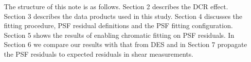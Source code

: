The structure of this note is as follows. Section 2 describes the DCR effect. 
Section 3 describes the data products used in this study. 
Section 4 discusses the fitting procedure, PSF residual definitions and the PSF fitting configuration.
Section 5 shows the results of enabling chromatic fitting on PSF residuals. 
In Section 6 we compare our results with that from DES and in Section 7 propagate the PSF residuals to expected residuals in shear measurements.

